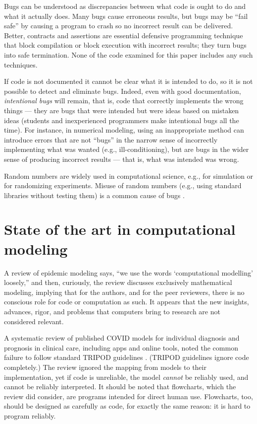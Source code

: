 \documentclass{comjnl}
\begin{document}
Bugs can be understood as discrepancies between what code is ought to do and what it actually does. Many bugs cause erroneous results, but bugs may be ``fail safe'' by causing a program to crash so no incorrect result can be delivered. Better, contracts and assertions are essential defensive programming technique that block compilation or block execution with incorrect results; they turn bugs into safe termination. None of the code examined for this paper includes any such techniques. 

If code is not documented it cannot be clear what it is intended to do, so it is not possible to detect and eliminate bugs. Indeed, even with good documentation, \emph{intentional bugs\/} will remain, that is, code that correctly implements the wrong things \cite{essence-of-software,fixit} --- they are bugs that were intended but were ideas based on mistaken ideas (students and inexperienced programmers make intentional bugs all the time). For instance, in numerical modeling, using an inappropriate method can introduce errors that are not ``bugs'' in the narrow sense of incorrectly implementing what was wanted (e.g., ill-conditioning), but are bugs in the wider sense of producing incorrect results --- that is, what was intended was wrong. 

Random numbers are widely used in computational science, e.g., for simulation or for randomizing experiments. Misuse of random numbers (e.g., using standard libraries without testing them) is a common cause of bugs \cite{knuth}.

\section{State of the art in computational modeling}
\label{section-pandemic-modeling}
A review of epidemic modeling \cite{science-review} says, ``we use the words `computational modelling' loosely,'' and then, curiously, the review discusses exclusively mathematical modeling, implying that for the authors, and for the peer reviewers, there is no conscious role for code or computation as such. It appears that the new insights, advances, rigor, and problems that computers bring to research are not considered relevant. 

A systematic review \cite{diagnosis-reviews} of published COVID models for individual diagnosis and prognosis in clinical care, including apps and online tools, noted the common failure to follow standard TRIPOD guidelines \cite{tripod}. (TRIPOD guidelines ignore code completely.) The review \cite{diagnosis-reviews} ignored the mapping from models to their implementation, yet if code is unreliable, the model \emph{cannot\/} be reliably used, and cannot be reliably interpreted. It should be noted that flowcharts, which the review did consider, are programs intended for direct human use. Flowcharts, too, should be designed as carefully as code, for exactly the same reason: it is hard to program reliably. 
\end{document}

